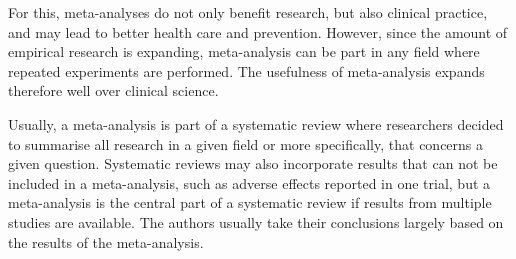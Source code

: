 \documentclass[11pt,a4paper,twoside]{book}\usepackage[]{graphicx}\usepackage[]{color}
\begin{document}
\vspace{0mm}
For this, meta-analyses do not only benefit research, but also clinical practice, and may lead to better health care and prevention. However, since the amount of empirical research is expanding, meta-analysis can be part in any field where repeated experiments are performed. The usefulness of meta-analysis expands therefore well over clinical science.

\vspace{0mm}
Usually, a meta-analysis is part of a systematic review where researchers decided to summarise all research in a given field or more specifically, that concerns a given question. Systematic reviews may also incorporate results that can not be included in a meta-analysis, such as adverse effects reported in one trial, but a meta-analysis is the central part of a systematic review if results from multiple studies are available. The authors usually take their conclusions largely based on the results of the meta-analysis.

% 
% 
% 
\end{document}
